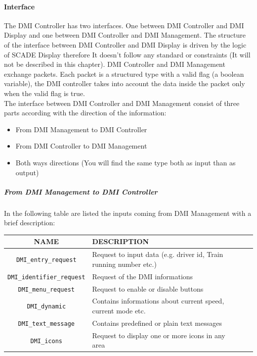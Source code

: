   \paragraph{Interface}
  The DMI Controller has two interfaces. One between DMI Controller and DMI Display and one between DMI Controller and DMI Management. 
  The structure of the interface between DMI Controller and DMI Display is driven by the logic of SCADE Display therefore It doesn't follow any standard or constraints (It will not be described in this chapter).
  DMI Controller and DMI Management exchange packets. Each packet is a structured type with a valid flag (a boolean variable), the DMI controller takes into account the data inside the packet only when the valid flag is true.\\
  The interface between DMI Controller and DMI Management consist of three parts according with the direction of the information:
  
  \begin{itemize}
  \item From DMI Management to DMI Controller
  \item From DMI Controller to DMI Management 
  \item Both ways directions (You will find the same type both as input than as output)
  \end{itemize}
  


\subparagraph{From DMI Management to DMI Controller}

In the following table are listed the inputs coming from DMI Management with a brief description:\\
    \begin{tabular}{| c | l | l | l | l |}
      \hline
      \textbf{NAME} & \textbf{DESCRIPTION} \\ \hline
      \texttt{DMI\_entry\_request} & Request to input data (e.g. driver id, Train running number etc.)\\
      \texttt{DMI\_identifier\_request} & Request of the DMI informations\\
      \texttt{DMI\_menu\_request} & Request to enable or disable buttons\\
      \texttt{DMI\_dynamic} & Contains informations about current speed, current mode etc.\\
      \texttt{DMI\_text\_message} & Contains predefined or plain text messages\\
      \texttt{DMI\_icons} & Request to display one or more icons in any area\\

      \hline
    \end{tabular} 
    \label{tbl:DMICtrToDMIMng}
  
